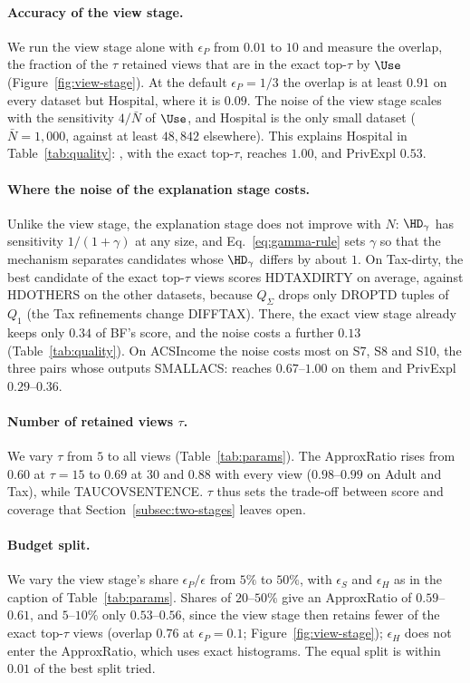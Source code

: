 \paragraph{Accuracy of the view stage.}
We run the view stage alone with $\epsilon_P$ from $0.01$ to $10$ and measure the overlap, the fraction of the $\tau$ retained views that are in the exact top-$\tau$ by $\Use$ (Figure~\ref{fig:view-stage}).
At the default $\epsilon_P=1/3$ the overlap is at least $0.91$ on every dataset but Hospital, where it is $0.09$.
The noise of the view stage scales with the sensitivity $4/\bar N$ of $\Use$, and Hospital is the only small dataset ($\bar N=1{,}000$, against at least $48{,}842$ elsewhere).
This explains Hospital in Table~\ref{tab:quality}: \Bone{}, with the exact top-$\tau$, reaches $1.00$, and \textsf{PrivExpl} $0.53$.

\paragraph{Where the noise of the explanation stage costs.}
Unlike the view stage, the explanation stage does not improve with $N$: $\HD_\gamma$ has sensitivity $1/(1+\gamma)$ at any size, and Eq.~\eqref{eq:gamma-rule} sets $\gamma$ so that the mechanism separates candidates whose $\HD_\gamma$ differs by about $1$.
On Tax-dirty, the best candidate of the exact top-$\tau$ views scores HDTAXDIRTY on average, against HDOTHERS on the other datasets, because $Q_\Sigma$ drops only DROPTD tuples of $Q_1$ (the Tax refinements change DIFFTAX).
There, the exact view stage already keeps only $0.34$ of \textsf{BF}'s score, and the noise costs a further $0.13$ (Table~\ref{tab:quality}).
On ACSIncome the noise costs most on S7, S8 and S10, the three pairs whose outputs SMALLACS: \Bone{} reaches $0.67$--$1.00$ on them and \textsf{PrivExpl} $0.29$--$0.36$.

\paragraph{Number of retained views $\tau$.}
We vary $\tau$ from $5$ to all views (Table~\ref{tab:params}).
The ApproxRatio rises from $0.60$ at $\tau=15$ to $0.69$ at $30$ and $0.88$ with every view ($0.98$--$0.99$ on Adult and Tax), while TAUCOVSENTENCE.
$\tau$ thus sets the trade-off between score and coverage that Section~\ref{subsec:two-stages} leaves open.

\paragraph{Budget split.}
We vary the view stage's share $\epsilon_P/\epsilon$ from $5\%$ to $50\%$, with $\epsilon_S$ and $\epsilon_H$ as in the caption of Table~\ref{tab:params}.
Shares of $20$--$50\%$ give an ApproxRatio of $0.59$--$0.61$, and $5$--$10\%$ only $0.53$--$0.56$, since the view stage then retains fewer of the exact top-$\tau$ views (overlap $0.76$ at $\epsilon_P=0.1$; Figure~\ref{fig:view-stage}); $\epsilon_H$ does not enter the ApproxRatio, which uses exact histograms.
The equal split is within $0.01$ of the best split tried.

